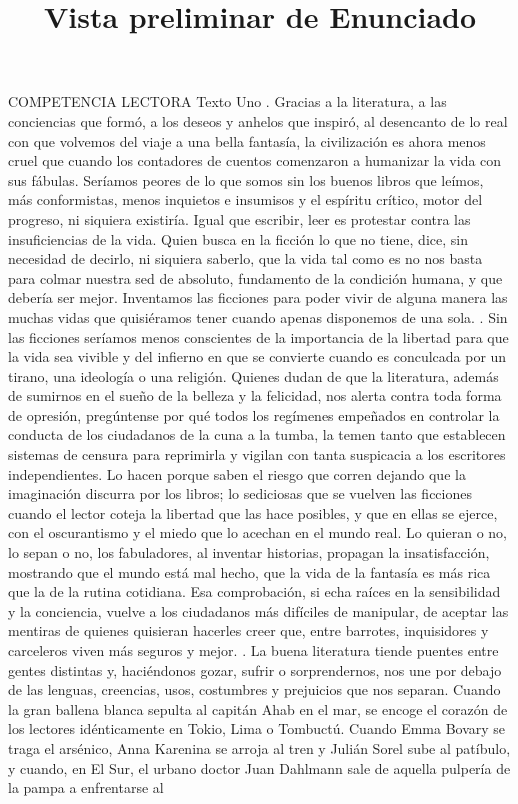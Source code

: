 \documentclass[a4paper,12pt]{article}\usepackage[spanish]{babel}\usepackage{times}
\title{Vista preliminar de Enunciado}
\begin{document}
\twocolumn 

\maketitle

COMPETENCIA LECTORA \newline Texto Uno . Gracias a la literatura, a las conciencias que formó, a los deseos y anhelos que inspiró, al desencanto de lo real con que volvemos del viaje a una bella fantasía, la civilización es ahora menos cruel que cuando los contadores de cuentos comenzaron a humanizar la vida con sus fábulas. Seríamos peores de lo que somos sin los buenos libros que leímos, más conformistas, menos inquietos e insumisos y el espíritu crítico, motor del progreso, ni siquiera existiría. Igual que escribir, leer es protestar contra las insuficiencias de la vida. Quien busca en la ficción lo que no tiene, dice, sin necesidad de decirlo, ni siquiera saberlo, que la vida tal como es no nos basta para colmar nuestra sed de absoluto, fundamento de la condición humana, y que debería ser mejor. Inventamos las ficciones para poder vivir de alguna manera las muchas vidas que quisiéramos tener cuando apenas disponemos de una sola. . Sin las ficciones seríamos menos conscientes de la importancia de la libertad para que la vida sea vivible y del infierno en que se convierte cuando es conculcada por un tirano, una ideología o una religión. Quienes dudan de que la literatura, además de sumirnos en el sueño de la belleza y la felicidad, nos alerta contra toda forma de opresión, pregúntense por qué todos los regímenes empeñados en controlar la conducta de los ciudadanos de la cuna a la tumba, la temen tanto que establecen sistemas de censura para reprimirla y vigilan con tanta suspicacia a los escritores independientes. Lo hacen porque saben el riesgo que corren dejando que la imaginación discurra por los libros; lo sediciosas que se vuelven las ficciones cuando el lector coteja la libertad que las hace posibles, y que en ellas se ejerce, con el oscurantismo y el miedo que lo acechan en el mundo real. Lo quieran o no, lo sepan o no, los fabuladores, al inventar historias, propagan la insatisfacción, mostrando que el mundo está mal hecho, que la vida de la fantasía es más rica que la de la rutina cotidiana. Esa comprobación, si echa raíces en la sensibilidad y la conciencia, vuelve a los ciudadanos más difíciles de manipular, de aceptar las mentiras de quienes quisieran hacerles creer que, entre barrotes, inquisidores y carceleros viven más seguros y mejor. . La buena literatura tiende puentes entre gentes distintas y, haciéndonos gozar, sufrir o sorprendernos, nos une por debajo de las lenguas, creencias, usos, costumbres y prejuicios que nos separan. Cuando la gran ballena blanca sepulta al capitán Ahab en el mar, se encoge el corazón de los lectores idénticamente en Tokio, Lima o Tombuctú. Cuando Emma Bovary se traga el arsénico, Anna Karenina se arroja al tren y Julián Sorel sube al patíbulo, y cuando, en El Sur, el urbano doctor Juan Dahlmann sale de aquella pulpería de la pampa a enfrentarse al 
\end{document}
